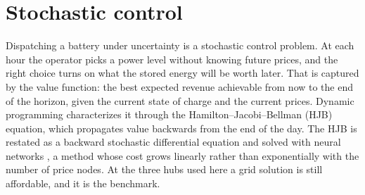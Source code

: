 \documentclass[11pt]{article}
\begin{document}
\section{Stochastic control}
\label{sec:control}

Dispatching a battery under uncertainty is a stochastic control problem.
At each hour the operator picks a power level without knowing future
prices, and the right choice turns on what the stored energy will be worth
later. That is captured by the value function: the best
expected revenue achievable from now to the end of the horizon, given the
current state of charge and the current prices. Dynamic programming
characterizes it through the Hamilton--Jacobi--Bellman (HJB) equation,
which propagates value backwards from the end of the day. The HJB
is restated as a backward stochastic differential equation
\cite{pardoux1990} and solved with neural networks
\cite{weinan2017,han2018}, a method whose cost grows linearly rather than
exponentially with the number of price nodes. At the three hubs used here
a grid solution is still affordable, and it is the benchmark.
\end{document}
